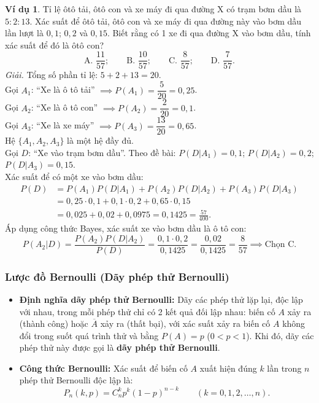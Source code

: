 \documentclass[12pt,a4paper]{article}
\theoremstyle{definition}
\newtheorem{vidu}{Ví dụ}[section]
\begin{document}
\begin{vidu}
Tỉ lệ ôtô tải, ôtô con và xe máy đi qua đường X có trạm bơm dầu là $5 : 2 : 13$. Xác suất để ôtô tải, ôtô con và xe máy đi qua đường này vào bơm dầu lần lượt là $0{,}1$; $0{,}2$ và $0{,}15$. Biết rằng có 1 xe đi qua đường X vào bơm dầu, tính xác suất để đó là ôtô con?\\
\[
\text{A. } \frac{11}{57}; \qquad \text{B. } \frac{10}{57}; \qquad \text{C. } \frac{8}{57}; \qquad \text{D. } \frac{7}{57}.
\]
\textit{Giải.} 
Tổng số phần tỉ lệ: $5 + 2 + 13 = 20$.\\
Gọi $A_1$: ``Xe là ô tô tải'' $\implies P(A_1) = \dfrac{5}{20} = 0{,}25$.\\
Gọi $A_2$: ``Xe là ô tô con'' $\implies P(A_2) = \dfrac{2}{20} = 0{,}1$.\\
Gọi $A_3$: ``Xe là xe máy'' $\implies P(A_3) = \dfrac{13}{20} = 0{,}65$.\\
Hệ $\{A_1, A_2, A_3\}$ là một hệ đầy đủ.\\
Gọi $D$: ``Xe vào trạm bơm dầu''. Theo đề bài:
$P(D|A_1) = 0{,}1$; $P(D|A_2) = 0{,}2$; $P(D|A_3) = 0{,}15$.\\
Xác suất để có một xe vào bơm dầu:
\begin{align*}
P(D) &= P(A_1)P(D|A_1) + P(A_2)P(D|A_2) + P(A_3)P(D|A_3) \\
     &= 0{,}25 \cdot 0{,}1 + 0{,}1 \cdot 0{,}2 + 0{,}65 \cdot 0{,}15 \\
     &= 0{,}025 + 0{,}02 + 0{,}0975 = 0{,}1425 = \frac{57}{400}.
\end{align*}
Áp dụng công thức Bayes, xác suất xe vào bơm dầu là ô tô con:
\[
P(A_2|D) = \frac{P(A_2)P(D|A_2)}{P(D)} = \frac{0{,}1 \cdot 0{,}2}{0{,}1425} = \frac{0{,}02}{0{,}1425} = \frac{8}{57} \implies \text{Chọn C.}
\]
\end{vidu}

\subsubsection{Lược đồ Bernoulli (Dãy phép thử Bernoulli)}
\begin{itemize}[leftmargin=1.5em]
    \item \textbf{Định nghĩa dãy phép thử Bernoulli:}
    Dãy các phép thử lặp lại, độc lập với nhau, trong mỗi phép thử chỉ có 2 kết quả đối lập nhau: biến cố $A$ xảy ra (thành công) hoặc $\overline{A}$ xảy ra (thất bại), với xác suất xảy ra biến cố $A$ không đổi trong suốt quá trình thử và bằng $P(A) = p$ ($0 < p < 1$). Khi đó, dãy các phép thử này được gọi là \textbf{dãy phép thử Bernoulli}.
    \item \textbf{Công thức Bernoulli:}
    Xác suất để biến cố $A$ xuất hiện đúng $k$ lần trong $n$ phép thử Bernoulli độc lập là:
    \[
    P_n(k, p) = C_n^k p^k (1 - p)^{n - k} \qquad (k = 0, 1, 2, \dots, n).
    \]
\end{itemize}
\end{document}
